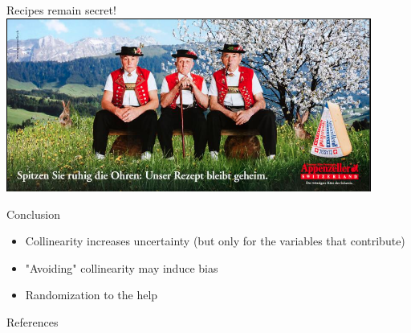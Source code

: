 \documentclass[english]{beamer}\usepackage[]{graphicx}\usepackage[]{xcolor}
\begin{document}
\begin{frame}{ }
Recipes remain secret!
\centering
\includegraphics[width=0.9\textwidth]{appenzeller.png}

\end{frame}
\begin{frame}{Conclusion}

\begin{itemize}
\item Collinearity increases uncertainty (but only for the variables that contribute)
\item "Avoiding" collinearity may induce bias
\item Randomization to the help
\end{itemize}


\end{frame}
\begin{frame}{References}
  \small
  


\end{frame}


\end{document}
